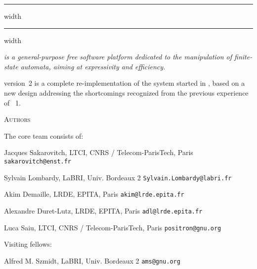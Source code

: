 \begin{titlepage}
  \thispagestyle{empty}
  \vskip15pt
  \begin{center}
    \vskip4pt \hrule height 4pt width \hsize \vskip4pt
    \vskip15pt
    {
      \Huge \vcsn \vcsnversion
    }
    \vskip15pt
    \vskip4pt \hrule height 4pt width \hsize \vskip4pt
  \end{center}
  \vskip15pt

  {
    \itshape
    \vcsn is a general-purpose free software platform dedicated to the
    manipulation of finite-state automata, aiming at expressivity and
    efficiency.
    
    \smallskip
    \vcsn version~2 is a complete re-implementation of the system
    started in , based on a new
    design addressing the shortcomings recognized from the previous
    experience of \vcsn~1.
    \begin{flushright}
    \end{flushright}
  }%
  \begin{center}
    \textsc{Authors}
  \end{center}
  {
The \vcsn core team consists of:
\medskip

\noindent
Jacques Sakarovitch, LTCI, CNRS / Telecom-ParisTech, Paris
\PushLine
{\tt sakarovitch@enst.fr}

\noindent
Sylvain Lombardy, LaBRI, Univ. Bordeaux 2
\PushLine
{\tt Sylvain.Lombardy@labri.fr}

\noindent
Akim Demaille, LRDE, EPITA, Paris
\PushLine
{\tt akim@lrde.epita.fr}

\noindent
Alexandre Duret-Lutz, LRDE, EPITA, Paris
\PushLine
{\tt adl@lrde.epita.fr}

\noindent
Luca Saiu, LTCI, CNRS / Telecom-ParisTech, Paris
\PushLine
{\tt positron@gnu.org}

\bigskip
\noindent
Visiting fellows:
\medskip

\noindent
Alfred M. Szmidt, LaBRI, Univ. Bordeaux 2
\PushLine
{\tt ams@gnu.org}

}
\end{titlepage}
